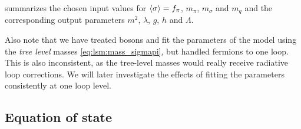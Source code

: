  summarizes the chosen input values for $\langle \sigma \rangle=f_\pi$, $m_\pi$, $m_\sigma$ and $m_q$ and the corresponding output parameters $m^2$, $\lambda$, $g$, $h$ and $\Lambda$.

Also note that we have treated bosons and fit the parameters of the model using the \emph{tree level} masses \eqref{eq:lsm:mass_sigmapi},
but handled fermions to one loop. 
This is also inconsistent, as the tree-level masses would really receive radiative loop corrections.
We will later investigate the effects of fitting the parameters consistently at one loop level.


\subsection{Equation of state}

